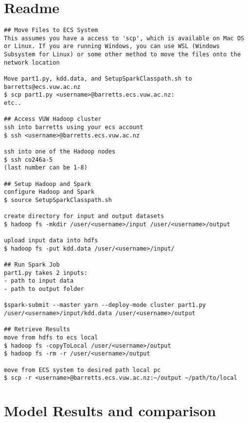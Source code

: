\documentclass[12pt, letterpaper]{article}
\begin{document}
\section{Readme}
\begin{verbatim}
## Move Files to ECS System
This assumes you have a access to 'scp', which is available on Mac OS 
or Linux. If you are running Windows, you can use WSL (Windows 
Subsystem for Linux) or some other method to move the files onto the 
network location

Move part1.py, kdd.data, and SetupSparkClasspath.sh to
barretts@ecs.vuw.ac.nz
$ scp part1.py <username>@barretts.ecs.vuw.ac.nz:
etc..

## Access VUW Hadoop cluster
ssh into barretts using your ecs account
$ ssh <username>@barretts.ecs.vuw.ac.nz

ssh into one of the Hadoop nodes 
$ ssh co246a-5
(last number can be 1-8)

## Setup Hadoop and Spark
configure Hadoop and Spark
$ source SetupSparkClasspath.sh

create directory for input and output datasets
$ hadoop fs -mkdir /user/<username>/input /user/<username>/output

upload input data into hdfs
$ hadoop fs -put kdd.data /user/<username>/input/

## Run Spark Job
part1.py takes 2 inputs:
- path to input data
- path to output folder

$spark-submit --master yarn --deploy-mode cluster part1.py
/user/<username>/input/kdd.data /user/<username>/output

## Retrieve Results
move from hdfs to ecs local
$ hadoop fs -copyToLocal /user/<username>/output
$ hadoop fs -rm -r /user/<username>/output

move from ECS system to desired path local pc
$ scp -r <username>@barretts.ecs.vuw.ac.nz:~/output ~/path/to/local
\end{verbatim}

\section{Model Results and comparison}
\end{document}
